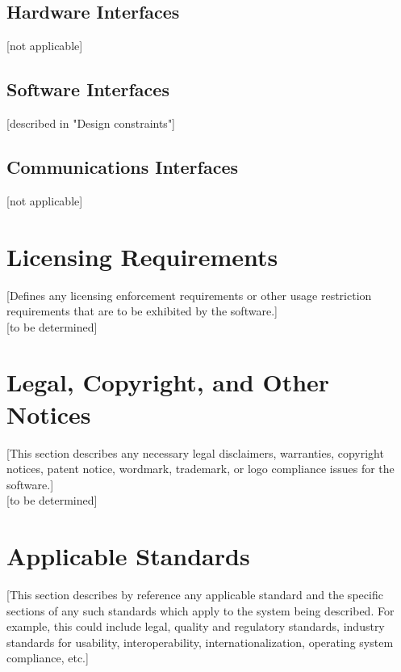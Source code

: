 \documentclass[a4paper,12pt,chapterprefix=false,bibliography=totoc,listof=totoc,]{scrreprt}
\begin{document}
\subsection{Hardware Interfaces}
[not applicable]

\subsection{Software Interfaces}
[described in "Design constraints"]

\subsection{Communications Interfaces}
[not applicable]

\section{{\color{blue} Licensing Requirements}}
{\color{blue} [Defines any licensing enforcement requirements or other usage restriction requirements that are to be exhibited by the software.]}\\

[to be determined]

\section{{\color{blue} Legal, Copyright, and Other Notices}}
{\color{blue} [This section describes any necessary legal disclaimers, warranties, copyright notices, patent notice, wordmark, trademark, or logo compliance issues for the software.]}\\

[to be determined]

\section{{\color{blue} Applicable Standards}}
{\color{blue} [This section describes by reference any applicable standard and the specific sections of any such standards which apply to the system being described. For example, this could include legal, quality and regulatory standards, industry standards for usability, interoperability, internationalization, operating system compliance, etc.]}\\
\end{document}
